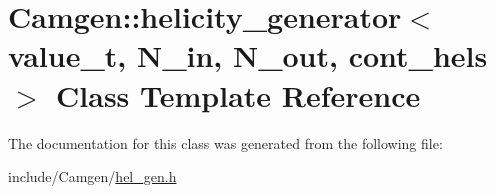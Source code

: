 \hypertarget{a00270}{}\section{Camgen\+:\+:helicity\+\_\+generator$<$ value\+\_\+t, N\+\_\+in, N\+\_\+out, cont\+\_\+hels $>$ Class Template Reference}
\label{a00270}


The documentation for this class was generated from the following file\+:\begin{DoxyCompactItemize}
\item 
include/\+Camgen/\hyperlink{a00659}{hel\+\_\+gen.\+h}\end{DoxyCompactItemize}
